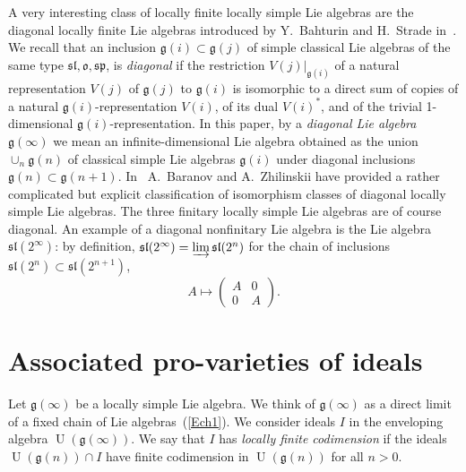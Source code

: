 \documentclass{emsprocart}
\begin{document}
A very interesting class of locally finite locally simple Lie algebras are the diagonal locally finite Lie algebras introduced by Y.~Bahturin and H.~Strade in~\cite{BhS}. We recall that an inclusion
$\mathfrak g(i)\subset \mathfrak g(j)$ of simple classical Lie algebras of the same type $\mathfrak{sl}, \mathfrak{o}, \mathfrak{sp}$, is {\it diagonal}
if the restriction $V(j)|_{\mathfrak g(i)}$ of a natural representation $V(j)$ of $\mathfrak g(j)$ to $\mathfrak g(i)$ is isomorphic
to a direct sum of copies of a natural $\mathfrak g(i)$-representation $V(i)$, of its dual $V(i)^*$, and
of the trivial 1{-}dimensional $\mathfrak g(i)$-representation. In this paper, by a {\it diagonal Lie
algebra} $\mathfrak g(\infty)$ we mean an infinite-dimensional Lie algebra obtained as the union $\cup_n\mathfrak g(n)$ of classical simple Lie
algebras $\mathfrak g(i)$ under diagonal inclusions $\mathfrak g(n)\subset\mathfrak g(n+1)$.  In~\cite{BZh1} A.~Baranov and A.~Zhilinskii have provided a rather complicated but explicit classification of isomorphism classes of diagonal locally simple Lie algebras. The three finitary locally simple Lie algebras are of course diagonal. An example of a diagonal nonfinitary Lie algebra is the Lie algebra $\mathfrak{sl}(2^\infty)$: by definition, $\mathfrak{sl}(2^\infty)=\varinjlim\mathfrak{sl}(2^n)$ for the chain of inclusions $\mathfrak{sl}(2^n)\subset\mathfrak{sl}(2^{n+1})$,$$A\mapsto\left(\begin{array}{cc}A&0\\0&A\end{array}\right).$$


\section{Associated pro-varieties of ideals}
Let $\mathfrak g(\infty)$ be a locally simple Lie algebra. We think of $\mathfrak g(\infty)$ as a direct limit of a fixed chain of Lie algebras~(\ref{Ech1}).  We consider ideals $I$ in the enveloping algebra $\operatorname{U}(\mathfrak g(\infty))$. We say that $I$ has {\it locally finite codimension} if the ideals $\operatorname{U}(\mathfrak g(n))\cap I$ have finite codimension in $\operatorname{U}(\mathfrak g(n))$ for all $n>0$.
\end{document}
